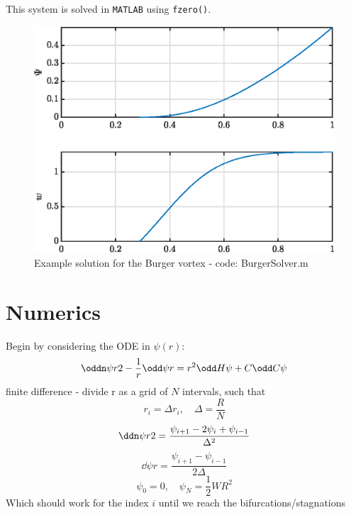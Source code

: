 \documentclass{X:/Documents/Coding/Latex/myreport}
\begin{document}
This system is solved in \verb|MATLAB| using \verb|fzero()|.



\begin{figure}[h]
    \centering
    \includegraphics[width=\linewidth]{Plots/burgerExampleSolution.eps}
    \caption{Example solution for the Burger vortex - code: BurgerSolver.m}
    \label{fig:burgerSol}
\end{figure}













\section{Numerics}
Begin by considering the ODE in $\psi(r)$:
\[\oddn \psi r 2 - \frac1r \odd \psi r = r^2 \odd H\psi + C\odd C\psi\]
finite difference - divide r as a grid of $N$ intervals, such that 
\[r_i = \Delta r_i, \quad \Delta  = \frac RN\]
\[\ddn \psi r 2 = \frac{\psi_{i+1} - 2 \psi_i + \psi_{i-1}}{\Delta ^2}\]
\[\dd \psi r = \frac{\psi_{i+1} - \psi_{i-1}}{2\Delta }\]
\[\psi_0 = 0, \quad \psi_N = \frac12 W R^2\]
Which should work for the index $i$ until we reach the bifurcations/stagnations
\end{document}
